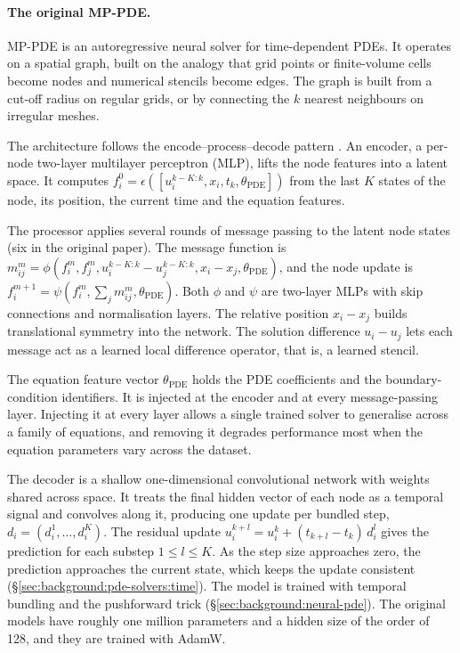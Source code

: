 \paragraph{The original MP-PDE.}
MP-PDE is an autoregressive neural solver for time-dependent PDEs. It
operates on a spatial graph, built on the analogy that grid points or
finite-volume cells become nodes and numerical stencils become edges. The
graph is built from a cut-off radius on regular grids, or by connecting
the $k$ nearest neighbours on irregular meshes.

The architecture follows the encode--process--decode pattern
\citep{Battaglia2018, SanchezGonzalez2020}. An encoder, a per-node
two-layer multilayer perceptron (MLP), lifts the node features into a
latent space. It computes
$f_i^0 = \epsilon([u_i^{k-K:k}, x_i, t_k, \theta_{\text{PDE}}])$ from the
last $K$ states of the node, its position, the current time and the
equation features.

The processor applies several rounds of message passing to the latent
node states (six in the original paper). The message function is
$m_{ij}^m = \phi(f_i^m, f_j^m, u_i^{k-K:k} - u_j^{k-K:k}, x_i - x_j,
\theta_{\text{PDE}})$, and the node update is
$f_i^{m+1} = \psi(f_i^m, \sum_j m_{ij}^m, \theta_{\text{PDE}})$. Both
$\phi$ and $\psi$ are two-layer MLPs with skip connections and
normalisation layers. The relative position $x_i - x_j$ builds
translational symmetry into the network. The solution difference
$u_i - u_j$ lets each message act as a learned local difference operator,
that is, a learned stencil.

The equation feature vector $\theta_{\text{PDE}}$ holds the PDE
coefficients and the boundary-condition identifiers. It is injected at the
encoder and at every message-passing layer. Injecting it at every layer
allows a single trained solver to generalise across a family of equations,
and removing it degrades performance most when the equation parameters
vary across the dataset.

The decoder is a shallow one-dimensional convolutional network with
weights shared across space. It treats the final hidden vector of each
node as a temporal signal and convolves along it, producing one update per
bundled step, $d_i = (d_i^1, \dots, d_i^K)$. The residual update
$u_i^{k+l} = u_i^k + (t_{k+l} - t_k)\, d_i^l$ gives the prediction for each
substep $1 \leq l \leq K$. As the step size approaches zero, the prediction
approaches the current state, which keeps the update consistent
(\S\ref{sec:background:pde-solvers:time}). The model is trained with
temporal bundling and the pushforward trick
(\S\ref{sec:background:neural-pde}). The original models have roughly one
million parameters and a hidden size of the order of 128, and they are
trained with AdamW.


